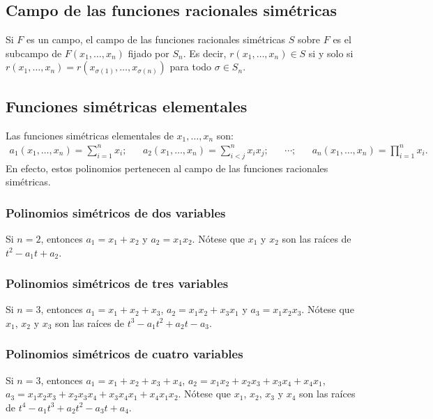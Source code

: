 \documentclass{article}
\begin{document}
\subsection*{\color{violet} Campo de las funciones racionales simétricas}

Si $F$ es un campo, el campo de las funciones racionales simétricas $S$ sobre $F$ es el subcampo de $F(x_1,\ldots,x_n)$ fijado por $S_n$. Es decir, $r(x_1,\ldots,x_n)\in S$ si y solo si $r(x_1,\ldots,x_n)=r(x_{\sigma(1)},\ldots,x_{\sigma(n)})$ para todo $\sigma\in S_n$.

\subsection*{\color{violet} Funciones simétricas elementales}

Las funciones simétricas elementales de $x_1,\ldots,x_n$ son:
\begin{align*}
a_1(x_1,\ldots,x_n)=\sum_{i=1}^n x_i; && a_2(x_1,\ldots,x_n)=\sum_{i<j}^n x_ix_j; && \cdots; && a_n(x_1,\ldots,x_n)=\prod_{i=1}^n x_i.
\end{align*}
En efecto, estos polinomios pertenecen al campo de las funciones racionales simétricas.

\newpage
\subsubsection*{\color{teal} Polinomios simétricos de dos variables}

Si $n=2$, entonces $a_1=x_1+x_2$ y $a_2=x_1x_2$. Nótese que $x_1$ y $x_2$ son las raíces de $t^2-a_1t+a_2$. 

\subsubsection*{\color{teal} Polinomios simétricos de tres variables}

Si $n=3$, entonces $a_1=x_1+x_2+x_3$, $a_2=x_1x_2+x_3x_1$ y $a_3=x_1x_2x_3$. Nótese que $x_1$, $x_2$ y $x_3$ son las raíces de $t^3-a_1t^2+a_2t-a_3$.

\subsubsection*{\color{teal} Polinomios simétricos de cuatro variables}

Si $n=3$, entonces $a_1=x_1+x_2+x_3+x_4$, $a_2=x_1x_2+x_2x_3+x_3x_4+x_4x_1$, $a_3=x_1x_2x_3+x_2x_3x_4+x_3x_4x_1+x_4x_1x_2$. Nótese que $x_1$, $x_2$, $x_3$ y $x_4$ son las raíces de $t^4-a_1t^3+a_2t^2-a_3t+a_4$.
\end{document}
